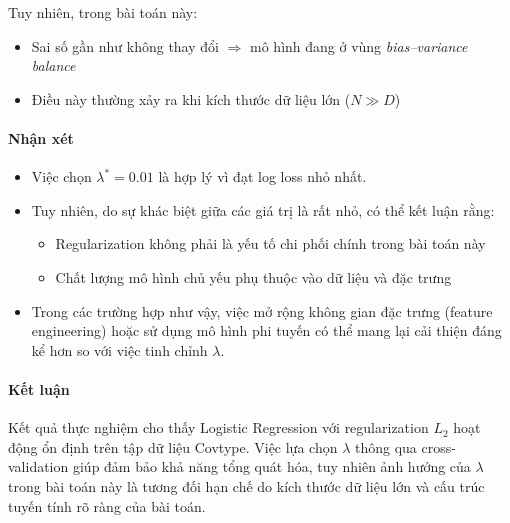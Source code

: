 Tuy nhiên, trong bài toán này:
\begin{itemize}
    \item Sai số gần như không thay đổi $\Rightarrow$ mô hình đang ở vùng \textit{bias--variance balance}
    \item Điều này thường xảy ra khi kích thước dữ liệu lớn ($N \gg D$)
\end{itemize}

\paragraph{Nhận xét}

\begin{itemize}
    \item Việc chọn $\lambda^* = 0.01$ là hợp lý vì đạt log loss nhỏ nhất.
    
    \item Tuy nhiên, do sự khác biệt giữa các giá trị là rất nhỏ, có thể kết luận rằng:
    \begin{itemize}
        \item Regularization không phải là yếu tố chi phối chính trong bài toán này
        \item Chất lượng mô hình chủ yếu phụ thuộc vào dữ liệu và đặc trưng
    \end{itemize}
    
    \item Trong các trường hợp như vậy, việc mở rộng không gian đặc trưng (feature engineering) hoặc sử dụng mô hình phi tuyến có thể mang lại cải thiện đáng kể hơn so với việc tinh chỉnh $\lambda$.
\end{itemize}

\paragraph{Kết luận}

Kết quả thực nghiệm cho thấy Logistic Regression với regularization $L_2$ hoạt động ổn định trên tập dữ liệu Covtype. Việc lựa chọn $\lambda$ thông qua cross-validation giúp đảm bảo khả năng tổng quát hóa, tuy nhiên ảnh hưởng của $\lambda$ trong bài toán này là tương đối hạn chế do kích thước dữ liệu lớn và cấu trúc tuyến tính rõ ràng của bài toán.